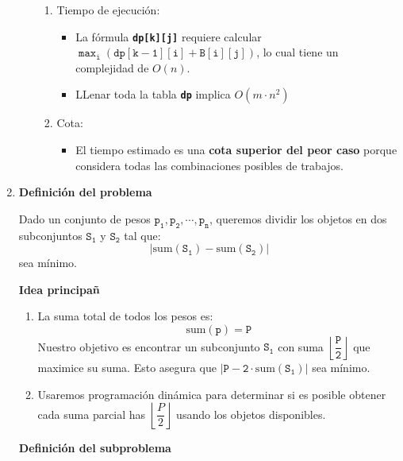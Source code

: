 \begin{enumerate}[label=\color{red}\textbf{\arabic*)}]
\begin{enumerate}[label=\color{red}\alph*)]
                  \begin{enumerate}[label=\arabic*)]
                    \item Tiempo de ejecución:
                      \begin{itemize}[label=\textbullet]
                        \item La fórmula \textbf{\texttt{dp[k][j]}} requiere calcular $\mathbf{\mathtt{\max_i(dp[k-1][i]+B[i][j])}}$, lo cual tiene un complejidad de $O(n)$.
                        \item LLenar toda la tabla  \textbf{\texttt{dp}} implica $O(m\cdot n^2)$
                      \end{itemize}
                    \item Cota:
                      \begin{itemize}[label=\textbullet]
                        \item El tiempo estimado es una \textbf{cota superior del peor caso} porque considera todas las combinaciones posibles de trabajos. 
                      \end{itemize}
                  \end{enumerate}
        \end{enumerate}
        
\item {} 

  \textbf{Definición del problema}

  Dado un conjunto de pesos $\mathbf{\mathtt{p_1,p_2,\cdots,p_n}}$, queremos dividir los objetos en dos subconjuntos $\mathbf{\mathtt{S_1}}$ y $\mathbf{\mathtt{S_2}}$ tal que: \[
  \mathbf{\mathtt{\left| \mathrm{sum}(S_1)-\mathrm{sum}(S_2) \right| }}
  \] sea mínimo.

  \textbf{Idea principañ}
  \begin{enumerate}[label=\arabic*)]
      \item La suma total de todos los pesos es: \[
              \mathbf{\mathtt{\mathrm{sum}(p)=P}}
      \] 
      Nuestro objetivo es encontrar un subconjunto $\mathbf{\mathtt{S_1}}$ con suma $\mathbf{\mathtt{\left\lfloor \dfrac{P}{2} \right\rfloor }}$ que maximice su suma. Esto asegura que $\mathbf{\mathtt{\left| P-2\cdot \mathrm{sum}(S_1) \right| }}$ sea mínimo.
  \item Usaremos programación dinámica para determinar si es posible obtener cada suma parcial has $\left\lfloor \dfrac{P}{2} \right\rfloor$ usando los objetos disponibles.
  \end{enumerate}
  \textbf{Definición del subproblema}


\end{enumerate}

